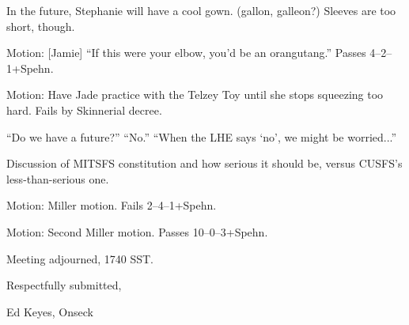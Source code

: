 \documentclass[12pt]{article}
\begin{document}
In the future, Stephanie will have a cool gown.  (gallon, galleon?)
Sleeves are too short, though.

Motion: [Jamie] ``If this were your elbow, you'd be an orangutang.''
Passes 4--2--1+Spehn.

Motion: Have Jade practice with the Telzey Toy until she stops
squeezing too hard.  Fails by Skinnerial decree.

``Do we have a future?''  ``No.''  ``When the LHE says `no', we
might be worried...''

Discussion of MITSFS constitution and how serious it should be, versus
CUSFS's less-than-serious one.

Motion: Miller motion.  Fails 2--4--1+Spehn.

Motion: Second Miller motion.  Passes 10--0--3+Spehn.

\vspace{12pt}

\noindent
Meeting adjourned, 1740 SST.

\vspace{18pt}

\centerline{Respectfully submitted,}
\centerline{Ed Keyes, Onseck}
\end{document}
